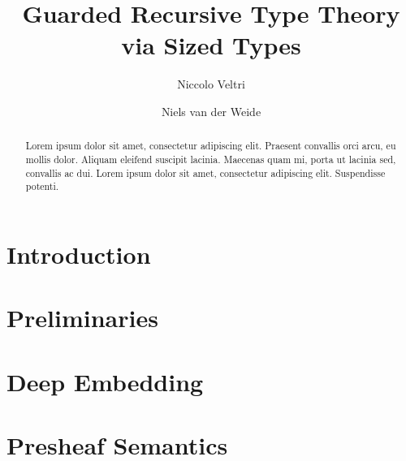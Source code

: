 \documentclass[a4paper,UKenglish,cleveref, autoref,numberwithinsect]{lipics-v2019}
\title{Guarded Recursive Type Theory via Sized Types}
\author{Niccolo Veltri}{Department of Informatics, Dummy College, [optional: Address], Country}{joanrpublic@dummycollege.org}{[orcid]}{[funding]}
\author{Niels van der Weide}{iCIS, Radboud University, The Netherlands}{nweide@cs.ru.nl}{[orcid]}{}
\begin{document}
\maketitle

\begin{abstract}
Lorem ipsum dolor sit amet, consectetur adipiscing elit. Praesent convallis orci arcu, eu mollis dolor. Aliquam eleifend suscipit lacinia. Maecenas quam mi, porta ut lacinia sed, convallis ac dui. Lorem ipsum dolor sit amet, consectetur adipiscing elit. Suspendisse potenti. 
 \end{abstract}

\section{Introduction}
\label{sec:intro}
\cite{atkey2013productive}

\section{Preliminaries}
\label{sec:prelim}



\section{Deep Embedding}
\label{sec:syntax}


\section{Presheaf Semantics}
\label{sec:presheaf_sem}
\end{document}
